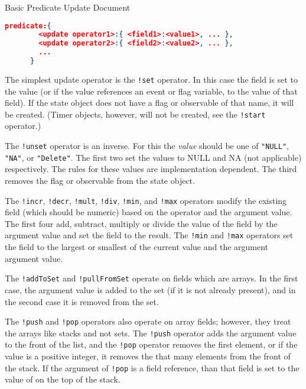 \documentclass{article}
\begin{document}
  \begin{algorithm}
    \caption{Basic Predicate Update Document}
    \label{json:pred}
    \begin{lstlisting}[language=json]
      predicate:{
        <update operator1>:{ <field1>:<value1>, ... },
        <update operator2>:{ <field2>:<value2>, ... },
        ...
      }
    \end{lstlisting}
  \end{algorithm}

  The simplest update operator is the \texttt{!set} operator.  In
  this case the field is set to the value (or if the value references
  an event or flag variable, to the value of that field).  If the
  state object does not have a flag or observable of that name, it
  will be created. (Timer objects, however, will not be created, see
  the \texttt{!start} operator.) 

  The \texttt{!unset} operator is an inverse.  For this the
  \textit{value} should be one of \texttt{"NULL"}, \texttt{"NA"}, or
  \texttt{"Delete"}.  The first two set the values to NULL and NA (not
  applicable) respectively.  The rules for these values are
  implementation dependent.  The third removes the flag or observable
  from the state object.

  The \texttt{!incr}, \texttt{!decr}, \texttt{!mult},
  \texttt{!div}, \texttt{!min}, and \texttt{!max} operators modify
  the existing field (which should be numeric) based on the operator
  and the argument value.  The first four add, subtract, multiply or
  divide the value of the field by the argument value and set the
  field to the result.   The \texttt{!min} and \texttt{!max}
  operators set the field to the largest or smallest of the current
  value and the argument argument value.

  The \texttt{!addToSet} and \texttt{!pullFromSet} operate on fields
  which are arrays.  In the first case, the argument value is added to
  the set (if it is not already present), and in the second case it is
  removed from the set.

  The \texttt{!push} and \texttt{!pop} operators also operate on
  array fields; however, they treat the arrays like stacks and not
  sets.  The \texttt{!push} operator adds the argument value to the
  front of the list, and the \texttt{!pop} operator removes the first
  element, or if the value is a positive integer, it removes the that
  many elements from the front of the stack.  If the argument of
  \texttt{!pop} is a field reference, than that field is set to the
  value of on the top of the stack.
\end{document}
